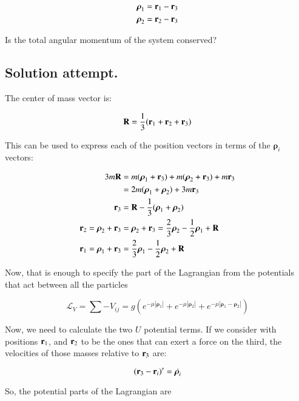 \documentclass{article}
\newcommand{\Brho}[0]{\boldsymbol{\rho}}
\newcommand{\LL}[0]{\mathcal{L}}
\newcommand{\Abs}[1]{\left\lvert{#1}\right\rvert}
\begin{document}
\begin{align*}
\Brho_1 &= \Br_1 - \Br_3 \\
\Brho_2 &= \Br_2 - \Br_3
\end{align*}

Is the total angular momentum of the system conserved?

\subsection{ Solution attempt. }

The center of mass vector is:

\begin{equation*}
\mathbf{R} = \frac{1}{3}(\mathbf{r}_1 + \mathbf{r}_2 + \mathbf{r}_3)
\end{equation*}

This can be used to express each of the position vectors in terms of the $\Brho_i$ vectors:

\begin{align*}
3 m \BR &= m (\Brho_1 + \Br_3) + m(\Brho_2 + \Br_3) + m \Br_3 \\
        &= 2 m (\Brho_1 + \Brho_2) + 3 m \Br_3 \\
  \Br_3 &= \BR - \inv{3}(\Brho_1 + \Brho_2) \\
\Br_2 = \Brho_2 + \Br_3 &= \Brho_2 + \Br_3 = \frac{2}{3} \Brho_2 - \inv{2} \Brho_1 + \BR \\
\Br_1 = \Brho_1 + \Br_3 &= \frac{2}{3} \Brho_1 - \inv{2} \Brho_2 + \BR \\
\end{align*}

Now, that is enough to specify the part of the Lagrangian from the potentials that act between all the particles

\begin{equation*}
\LL_V = \sum -V_{ij} = g \left( e^{-\mu \Abs{\Brho_1}} + e^{-\mu \Abs{\Brho_2}} + e^{-\mu \Abs{ \Brho_1 - \Brho_2 }} \right)
\end{equation*}

Now, we need to calculate the two $U$ potential terms.  If we consider with positions $\mathbf{r}_1$, and $\mathbf{r}_2$ to be the ones
that can exert a force on the third, the velocities of those masses relative to $\mathbf{r}_3$ are:

\begin{equation*}
(\Br_3 - \Br_i)' = \dot{\Brho_i}
\end{equation*}

So, the potential parts of the Lagrangian are
\end{document}
